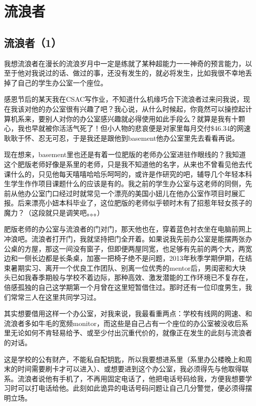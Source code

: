 \documentclass[12pt]{book}
\begin{document}
\chapter{流浪者}
\label{sec-39}
\section{流浪者（1）}
\label{sec-39-1}
我想流浪者在漫长的流浪岁月中一定是练就了某种超能力一一神奇的预言能力，以至于他对我说过的话、做过的事，还没有发生的，就必将发生，比如我很不幸地丢掉了自己的学生办公室一个座位。

感恩节后的某天我在CSAC写作业，不知道什么机缘巧合下流浪者过来问我说，现在我该对他的办公室很有兴趣了吧？我心说，从什么时候起，你竟然可以操控起计算机系来，要别人对你的办公室感兴趣就必得使用如此手段么？就算是我有十颗心，我也早就被你活活气死了！但小人物的悲哀便是对家里每月交付\$46.34的网速耿耿于怀、忍无可忍，于是我还是跟他到basement他办公室里先去看看再说。

现在想来，basement里也还是有着一位肥版的老师办公室进驻作眼线的？我知道这个肥版老师好像是系里的老师，只是我不知道他的名字，从来也不曾看见他去代课什么的，只见他每天嘻嘻哈哈乐呵呵的，或许是作研究的吧，辅导几个年轻本科生学生作作项目课题什么的应该是有的。我之前的学生办公室与这老师的同侧，先前从他办公室门口经过时就常见一个漂亮的美国小妞儿在他办公室作项目时展汇报。后来漂亮小妞本科毕业了，这位肥版的老师似乎顿时木有了招惹年轻女孩子的魔力？（这段就只是调笑吧。。。）

肥版老师的办公室与流浪者的门对门，那天他也在，穿着蓝色衬衣坐在电脑前网上冲浪吧。流浪者打开门，我就坚持把门全开着。如果说我先前办公室是能摆两张办公桌的方屋，那这一间没有窗子，但即便两屋同宽，也足够有先前的两个大，两宽边和一侧长边都是长条桌，加塞一把椅子绝不是问题，2013年秋季学期伊期，在结束暑期实习、离开一个优良工作团队、别离一位优秀的mentor后，男闺密和大块头已如我春季期般与学校不着边际，那种高效、激发潜能的工作环境已不复存在，倍感孤独的自己这学期第一个月曾在这里短暂借住过。那时还有一位印度男生，我们常常三人在这里共同学习过。

其实想要借用这样一个办公室，对我来说，我最看重两点：学校有线网的网速、和流浪者多如牛毛的宽频monitor，而这些是自己占有一个座位的办公室被没收后系里无论如何不肯轻易给予、或至少付出沉重代价的，就像正在发生的此刻与流浪者的对话。

这是学校的公有财产，不能私自配钥匙，所以我要想进系里（系里办公楼晚上和周末的时间需要刷卡才可以进入）、或想要进到这个办公室，我必须得先与他取得联系。流浪者说他有手机了，不再用固定电话了，他把电话号码给我，方便我想要学习时可以打电话给他。此刻如此诡异的电话号码问题让自己几分警觉，便必须得摆明立场。
\end{document}
